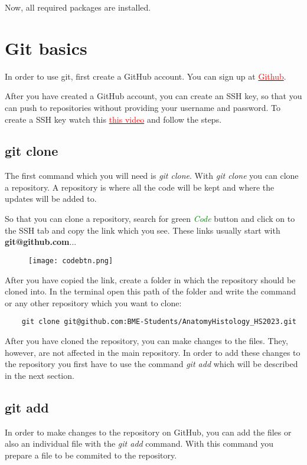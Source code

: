 \documentclass[
	a4paper, %
	10pt, %
	unnumberedsections, %
	twoside, %
	onecolumn,
]{LTJournalArticle}
\begin{document}
Now, all required packages are installed.

\section{Git basics}
In order to use git, first create a GitHub account. You can sign up at \href{https://github.com}{\textcolor{red}{Github}}.

After you have created a GitHub account, you can create an SSH key, so that you can push to repositories without providing your username and password.
To create a SSH key watch this \href{https://www.youtube.com/watch?v=8X4u9sca3Io}{\textcolor{red}{this video}} and follow the steps.

\subsection{git clone}
The first command which you will need is \emph{git clone}. With \emph{git clone} you can clone a repository. A repository is where all the code will be kept and where the updates will be added to. 

So that you can clone a repository, search for green \emph{\textcolor{green}{Code}} button and click on to the SSH tab and copy the link which you see. These links usually start with \textbf{git@github.com}...

\begin{figure}[h]
	\centering
	\texttt{[image: codebtn.png]}
\end{figure}

After you have copied the link, create a folder in which the repository should be cloned into. 
In the terminal open this path of the folder and write the command or any other repository which you want to clone:
\begin{verbatim}
	git clone git@github.com:BME-Students/AnatomyHistology_HS2023.git
\end{verbatim}

After you have cloned the repository, you can make changes to the files. They, however, are not affected in the main repository. In order to add these changes to the repository you first have to use the command \emph{git add} which will be described in the next section.

\subsection{git add}
In order to make changes to the repository on GitHub, you can add the files or also an individual file with the \emph{git add} command. With this command you prepare a file to be commited to the repository. 
\end{document}
